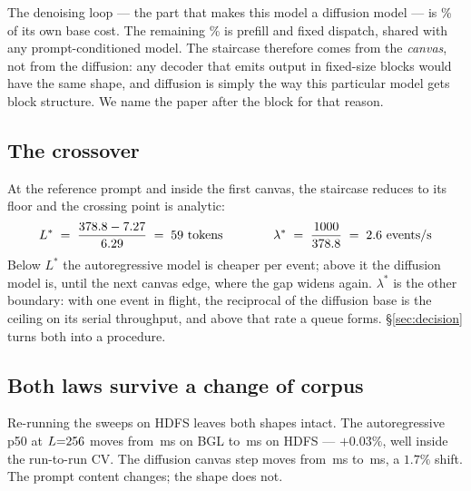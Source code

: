 \begin{keybox}
The denoising loop --- the part that makes this model a diffusion model --- is
\dgDenoisePct\% of its own base cost. The remaining \dgPrefillPct\% is prefill
and fixed dispatch, shared with any prompt-conditioned model. The staircase
therefore comes from the \emph{canvas}, not from the diffusion: any decoder
that emits output in fixed-size blocks would have the same shape, and
diffusion is simply the way this particular model gets block structure. We
name the paper after the block for that reason.
\end{keybox}

\subsection{The crossover}

At the reference prompt and inside the first canvas, the staircase reduces to
its floor and the crossing point is analytic:
\begin{equation}
\label{eq:lcross}
L^{*} \;=\; \frac{\dgBase - \arBase}{\arSlope} \;=\; \crossoverL \ \text{tokens}
\qquad\qquad
\lambda^{*} \;=\; \frac{1000}{\dgBase} \;=\; \crossoverLambda \ \text{events/s}
\end{equation}
Below $L^{*}$ the autoregressive model is cheaper per event; above it the
diffusion model is, until the next canvas edge, where the gap widens again.
$\lambda^{*}$ is the other boundary: with one event in flight, the reciprocal
of the diffusion base is the ceiling on its serial throughput, and above that
rate a queue forms. \S\ref{sec:decision} turns both into a procedure.

\subsection{Both laws survive a change of corpus}

Re-running the sweeps on HDFS leaves both shapes intact. The autoregressive
p50 at $L{=}256$ moves from \arBgl\,ms on BGL to \arHdfs\,ms on HDFS
--- $+0.03\%$, well inside the run-to-run CV. The diffusion canvas step moves
from \bglStep\,ms to \hdfsStep\,ms, a $1.7\%$ shift. The prompt content
changes; the shape does not.
